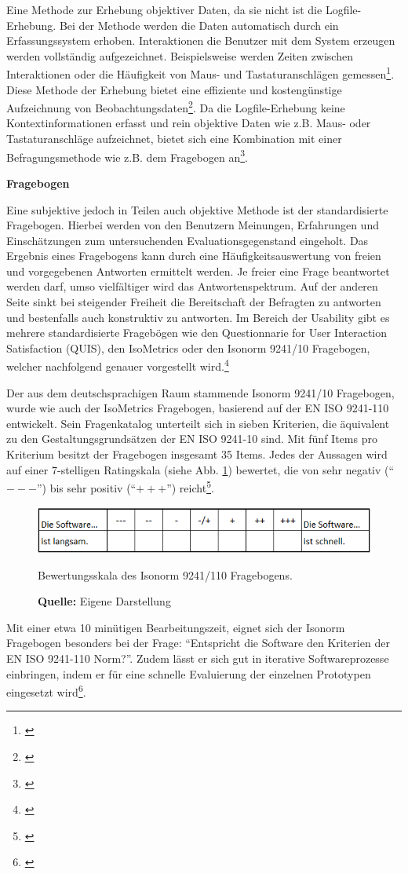 Eine Methode zur Erhebung objektiver Daten, da sie nicht ist die Logfile-Erhebung. Bei der Methode werden die Daten automatisch durch ein Erfassungssystem erhoben. Interaktionen die Benutzer mit dem System erzeugen werden vollständig aufgezeichnet. Beispielsweise werden Zeiten zwischen Interaktionen oder die Häufigkeit von Maus- und Tastaturanschlägen gemessen\footnote{\cite[vgl.][63]{Hegner2003}}. Diese Methode der Erhebung bietet eine effiziente und kostengünstige Aufzeichnung von Beobachtungsdaten\footnote{\cite[vgl.][Kap. 65.3]{Baur2014}}. Da die Logfile-Erhebung keine Kontextinformationen erfasst und rein objektive Daten wie z.B. Maus- oder Tastaturanschläge aufzeichnet, bietet sich eine Kombination mit einer Befragungsmethode wie z.B. dem Fragebogen an\footnote{\cite[vgl.][17\psq]{Hegner2003}}.

\textbf{Fragebogen}

Eine subjektive jedoch in Teilen auch objektive Methode ist der standardisierte Fragebogen. Hierbei werden von den Benutzern Meinungen, Erfahrungen und Einschätzungen zum untersuchenden Evaluationsgegenstand eingeholt. Das Ergebnis eines Fragebogens kann durch eine Häufigkeitsauswertung von freien und vorgegebenen Antworten ermittelt werden. Je freier eine Frage beantwortet werden darf, umso vielfältiger wird das Antwortenspektrum. Auf der anderen Seite sinkt bei steigender Freiheit die Bereitschaft der Befragten zu antworten und bestenfalls auch konstruktiv zu antworten. Im Bereich der Usability gibt es mehrere standardisierte Fragebögen wie den Questionnarie for User Interaction Satisfaction (QUIS), den IsoMetrics oder den Isonorm 9241/10 Fragebogen, welcher nachfolgend genauer vorgestellt wird.\footnote{\cite[vgl.][Kap. 4.5.1.1]{Hegner2003}}

Der aus dem deutschsprachigen Raum stammende Isonorm 9241/10 Fragebogen, wurde wie auch der IsoMetrics Fragebogen, basierend auf der EN ISO 9241-110 entwickelt. Sein Fragenkatalog unterteilt sich in sieben Kriterien, die äquivalent zu den Gestaltungsgrundsätzen der EN ISO 9241-10 sind. Mit fünf Items pro Kriterium besitzt der Fragebogen insgesamt 35 Items. Jedes der Aussagen wird auf einer 7-stelligen Ratingskala (siehe Abb. \ref{fig:IsonormBewertungsskala}) bewertet, die von sehr negativ (\enquote{$---$}) bis sehr positiv (\enquote{$+++$}) reicht\footnote{\cite[vgl.][Kap. 3.3]{Figl2010}}. 
\begin{figure}[H]
  \centering
  \includegraphics[scale=0.95]{img/Isonorm_Bewertungsskala.PNG}
  \caption{Bewertungsskala des Isonorm 9241/110 Fragebogens.}
  \caption*{\textbf{Quelle:} Eigene Darstellung}
  \label{fig:IsonormBewertungsskala}
\end{figure}
Mit einer etwa 10 minütigen Bearbeitungszeit, eignet sich der Isonorm Fragebogen besonders bei der Frage: \enquote{Entspricht die Software den Kriterien der EN ISO 9241-110 Norm?}. Zudem lässt er sich gut in iterative Softwareprozesse einbringen, indem er für eine schnelle Evaluierung der einzelnen Prototypen eingesetzt wird\footnote{\cite[vgl.][Kap. 3.3]{Figl2010}}.

